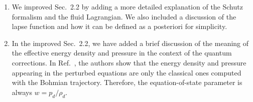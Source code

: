 \documentclass[a4paper,11pt]{article}
\begin{document}
\begin{enumerate}
            \begin{enumerate}
                  \item We improved Sec.~2.2 by adding a more detailed explanation of the
                        Schutz formalism and the fluid Lagrangian. We also included a
                        discussion of the lapse function and how it can be defined as a
                        posteriori for simplicity.

                  \item In the improved Sec.~2.2, we have added a brief discussion of the
                        meaning of the effective energy density and pressure in the context
                        of the quantum corrections. In Ref.~\cite{fluidgeral}, the authors
                        show that the energy density and pressure appearing in the perturbed
                        equations are only the classical ones computed with the Bohmian
                        trajectory. Therefore, the equation-of-state parameter is always
                        $w=p_d/\rho_d$.


\end{enumerate}
\end{enumerate}
\end{document}
